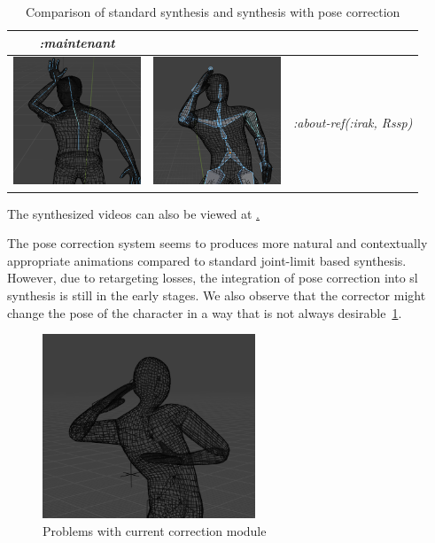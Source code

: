 \documentclass[../../main.tex]{subfiles}
\begin{document}
\begin{table}
\begin{tabular}{|c|c|c|}
      \emph{:maintenant} \\
    \hline
    \includegraphics[width = 1.5in]{chapters/intermediate_blocks_pose_correction/images/standard_synthesis_abt_ref_irak.png} & \includegraphics[width = 1.5in]{chapters/intermediate_blocks_pose_correction/images/pose_correction_synthesis_abt_ref_irak.png} &
      \emph{:about-ref(:irak, Rssp)} \\
    \hline
  \end{tabular}
  \caption{Comparison of standard synthesis and synthesis with pose correction}
  \label{tab:results}
\end{table}

The synthesized videos can also be viewed at \href{todo}.

The pose correction system seems to produces more natural and contextually appropriate animations compared to standard joint-limit based synthesis. However, due to retargeting losses, the integration of pose correction into \gls{sl} synthesis is still in the early stages. We also observe that the corrector might change the pose of the character in a way that is not always desirable~\ref{fig:problem_pose_correction}.

\begin{figure}
  \centering \includegraphics[width = 2.5in]{chapters/intermediate_blocks_pose_correction/images/problem_pose_correction.png}
  \caption{Problems with current correction module}
  \label{fig:problem_pose_correction}
\end{figure}
\end{document}
